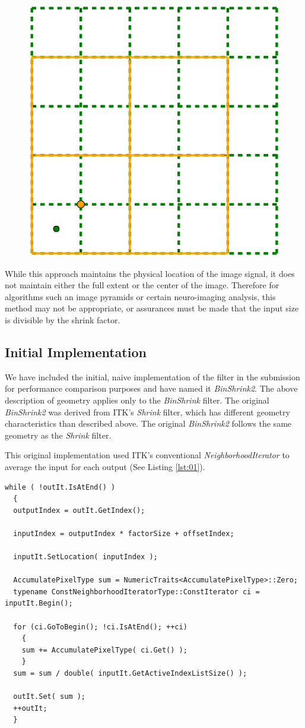 \documentclass{InsightArticle}
\begin{document}
\begin{figure}
  \centering
  \includegraphics[width=0.4\linewidth]{images/pixelgrid}
  \label{fig:PixelGrid}
\end{figure}

While this approach maintains the physical location of the image
signal, it does not maintain either the full extent or the
center of the image. Therefore for algorithms such an image pyramids or certain
neuro-imaging analysis, this method may not be appropriate, or
assurances must be made that the input size is divisible by the shrink factor.

\subsection{Initial Implementation}

We have included the initial, naive implementation of the filter in the
submission for performance comparison purposes and have named it
\textit{BinShrink2}. The above description of geometry applies only to the
\textit{BinShrink} filter. The original \textit{BinShrink2} was
derived from ITK's \textit{Shrink} filter, which has different
geometry characteristics than described above. The original \textit{BinShrink2}
follows the same geometry as the \textit{Shrink} filter.

This original implementation used ITK's conventional
\textit{NeighborhoodIterator} to average the input for each output
(See Listing \ref{lst:01}).

\begin{lstlisting}[label=lst:01, caption={A selected section of code
      from \textit{BinShrink2} filter using the neighborhood iterator.}]
while ( !outIt.IsAtEnd() )
  {
  outputIndex = outIt.GetIndex();

  inputIndex = outputIndex * factorSize + offsetIndex;

  inputIt.SetLocation( inputIndex );

  AccumulatePixelType sum = NumericTraits<AccumulatePixelType>::Zero;
  typename ConstNeighborhoodIteratorType::ConstIterator ci = inputIt.Begin();

  for (ci.GoToBegin(); !ci.IsAtEnd(); ++ci)
    {
    sum += AccumulatePixelType( ci.Get() );
    }
  sum = sum / double( inputIt.GetActiveIndexListSize() );

  outIt.Set( sum );
  ++outIt;
  }
\end{lstlisting}
\end{document}
